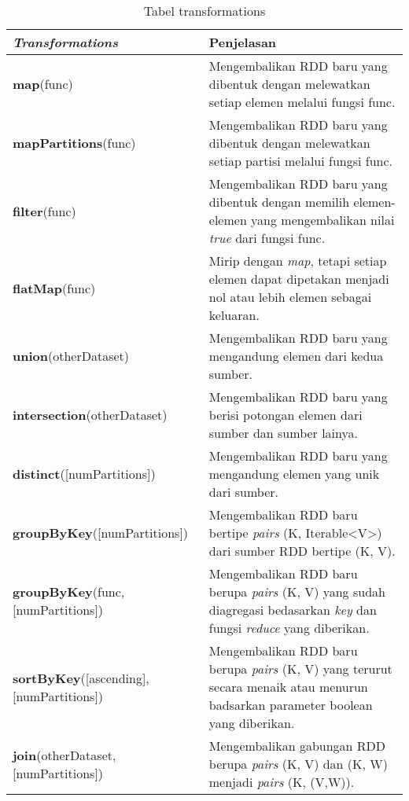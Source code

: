 \begin{table}[H] 
	\centering 
	\caption{Tabel transformations}
	\label{tab:trans}
	\begin{tabular}{p{6cm}p{9cm}}
		\toprule[1.5pt]
\hline
		 \textbf{\textit{Transformations}} & Penjelasan \\
\hline
\midrule

\hline
\textbf{map}(func) & Mengembalikan RDD baru yang dibentuk dengan melewatkan setiap elemen melalui fungsi func. \\
\hline

\textbf{mapPartitions}(func) & Mengembalikan RDD baru yang dibentuk dengan melewatkan setiap partisi melalui fungsi func.\\

\hline

\textbf{filter}(func) & Mengembalikan RDD baru yang dibentuk dengan memilih elemen-elemen yang mengembalikan nilai \textit{true} dari fungsi func. \\
\hline

\textbf{flatMap}(func) & Mirip dengan \textit{map}, tetapi setiap elemen dapat dipetakan menjadi nol atau lebih elemen sebagai keluaran. \\
\hline


\textbf{union}(otherDataset) & Mengembalikan RDD baru yang mengandung elemen dari kedua sumber.\\

\hline
\textbf{intersection}(otherDataset) & Mengembalikan RDD baru yang berisi potongan elemen dari sumber dan sumber lainya.\\ 

\hline
\textbf{distinct}([numPartitions]) & Mengembalikan RDD baru yang mengandung elemen yang unik dari sumber.\\

\hline
\textbf{groupByKey}([numPartitions]) & Mengembalikan RDD baru bertipe \textit{pairs}  (K, Iterable<V>) dari sumber RDD bertipe (K, V).\\


\hline
\textbf{groupByKey}(func,[numPartitions]) & Mengembalikan RDD baru berupa \textit{pairs} (K, V) yang sudah diagregasi bedasarkan \textit{key} dan fungsi \textit{reduce} yang diberikan.\\

\hline
\textbf{sortByKey}([ascending], [numPartitions]) & Mengembalikan RDD baru berupa \textit{pairs}  (K, V) yang terurut secara menaik atau menurun badsarkan parameter boolean yang diberikan.\\

\hline
\textbf{join}(otherDataset, [numPartitions]) & Mengembalikan gabungan RDD berupa \textit{pairs}  (K, V) dan (K, W) menjadi \textit{pairs} (K, (V,W)).\\

\hline


\bottomrule
		
	\end{tabular} 
\end{table}

